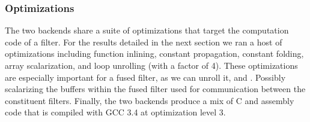 \subsubsection{Optimizations}

The two backends share a suite of optimizations that target the
computation code of a filter.  For the results detailed in the next
section we ran a host of optimizations including function inlining,
constant propagation, constant folding, array scalarization, and loop
unrolling (with a factor of 4).  These optimizations are especially
important for a fused filter, as we can unroll it, and .  Possibly
scalarizing the buffers within the fused filter used for communication
between the constituent filters.  Finally, the two backends produce a
mix of C and assembly code that is compiled with GCC 3.4 at
optimization level 3.
